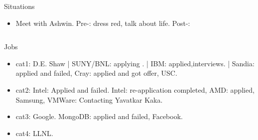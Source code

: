 \begin{columns}
\begin{column}{0.333\columnwidth}
\begin{columns}
\begin{column}{0.20\linewidth}
      \begin{block}{Situations}
        \begin{itemize}
          \tiny \item \tiny Meet with Ashwin. Pre-: dress red, talk
          about life. Post-:
        \end{itemize}
      \end{block}
    \end{column}
\end{columns}
  \begin{block}{Jobs}
    \begin{itemize}
      \tiny \item \tiny cat1: D.E. Shaw | SUNY/BNL: applying . | IBM:
      applied,interviews.  | Sandia: applied and failed, Cray: applied and got offer, USC. 
    \item \tiny cat2: Intel: Applied and failed. Intel: re-application  completed, AMD: applied, Samsung, VMWare: Contacting Yavatkar Kaka. 
    \item \tiny cat3: Google. MongoDB: applied and failed, Facebook. 
    \item \tiny cat4: LLNL. 
    \end{itemize} 
  \end{block} 



\end{column}
\end{columns}

